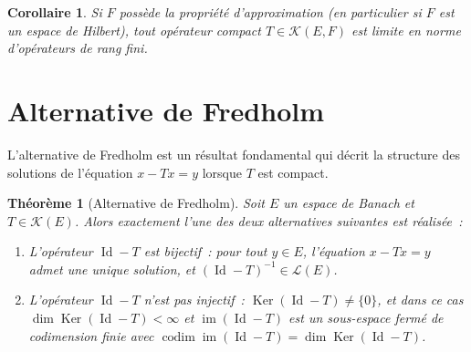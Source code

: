 \documentclass[a4paper,12pt]{book}
\DeclareMathOperator{\im}{im}
\DeclareMathOperator{\Id}{Id}
\DeclareMathOperator{\Ker}{Ker}
\DeclareMathOperator{\codim}{codim}
\theoremstyle{definition}
\theoremstyle{plain}
\newtheorem{theoreme}[definition]{Théorème}
\newtheorem{corollaire}[definition]{Corollaire}
\theoremstyle{remark}
\begin{document}
\begin{corollaire}
\label{cor:limite-rang-fini}
Si $F$ possède la propriété d'approximation (en particulier si $F$ est un espace de
Hilbert), tout opérateur compact $T \in \mathcal{K}(E,F)$ est limite en norme
d'opérateurs de rang fini.
\end{corollaire}

\section{Alternative de Fredholm}

L'alternative de Fredholm est un résultat fondamental qui décrit la structure des
solutions de l'équation $x - Tx = y$ lorsque $T$ est compact.

\begin{theoreme}[Alternative de Fredholm]
\label{thm:fredholm}
Soit $E$ un espace de Banach et $T \in \mathcal{K}(E)$. Alors exactement l'une des deux
alternatives suivantes est réalisée~:
\begin{enumerate}[label=\textbf{(\alph*)}]
  \item L'opérateur $\Id - T$ est bijectif~: pour tout $y \in E$, l'équation $x - Tx = y$
        admet une unique solution, et $(\Id - T)^{-1} \in \mathcal{L}(E)$.
  \item L'opérateur $\Id - T$ n'est pas injectif~: $\Ker(\Id - T) \neq \{0\}$, et dans
        ce cas $\dim \Ker(\Id - T) < \infty$ et $\im(\Id - T)$ est un sous-espace fermé
        de codimension finie avec
        $\codim \im(\Id - T) = \dim \Ker(\Id - T)$.
\end{enumerate}
\end{theoreme}
\end{document}
